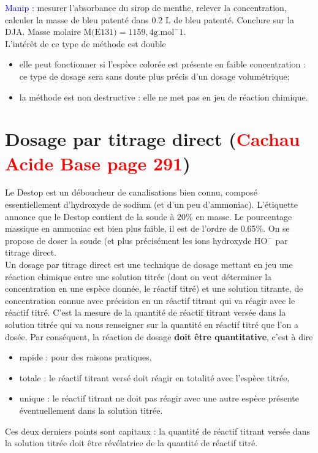 \documentclass[11pt,a4paper]{report}
\begin{document}
\textcolor{blue}{Manip :} mesurer l'absorbance du sirop de menthe, relever la concentration, calculer la masse de bleu patenté dans 0.2 L de bleu patenté. Conclure sur la DJA.
Masse molaire $\text{M(E131)} = 1159,4 \text{g}.\text{mol}^-1$.\\

L'intérêt de ce type de méthode est double
\begin{itemize}
	\item elle peut fonctionner si l'espèce colorée est présente en faible concentration : ce type de dosage sera sans doute plus précis d'un dosage volumétrique;
	\item la méthode est non destructive : elle ne met pas en jeu de réaction chimique.
\end{itemize}

\section{Dosage par titrage direct (\textcolor{red}{Cachau Acide Base page 291})}

Le Destop est un déboucheur de canalisations bien connu, composé essentiellement d'hydroxyde de sodium (et d'un peu d'ammoniac). L'étiquette annonce que le Destop contient de la soude à 20\% en masse. Le pourcentage massique en ammoniac est bien plus faible, il est de l'ordre de 0.65\%. On se propose de doser la soude (et plus précisément les ions hydroxyde $\text{HO}^-$ par titrage direct.\\

Un dosage par titrage direct est une technique de dosage mettant en jeu une réaction chimique entre une solution titrée (dont on veut déterminer la concentration en une espèce donnée, le réactif titré) et une solution titrante, de concentration connue avec précision en un réactif titrant qui va réagir avec le réactif titré. C'est la mesure de la quantité de réactif titrant versée dans la solution titrée qui va nous renseigner sur la quantité en réactif titré que l'on a dosée. Par conséquent, la réaction de dosage \textbf{doit être quantitative}, c'est à dire
\begin{itemize}
	\item rapide : pour des raisons pratiques,
	\item totale : le réactif titrant versé doit réagir en totalité avec l'espèce titrée,
	\item unique : le réactif titrant ne doit pas réagir avec une autre espèce présente éventuellement dans la solution titrée.
\end{itemize}
Ces deux derniers points sont capitaux : la quantité de réactif titrant versée dans la solution titrée doit être révélatrice de la quantité de réactif titré.\\
\end{document}
